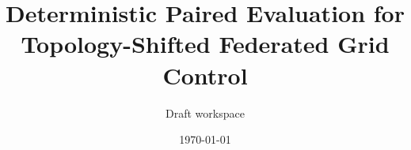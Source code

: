 \documentclass[11pt]{article}
\title{Deterministic Paired Evaluation for Topology-Shifted Federated Grid Control}
\author{Draft workspace}
\date{\today}
\begin{document}
\maketitle

\begin{abstract}

\end{abstract}








\end{document}
